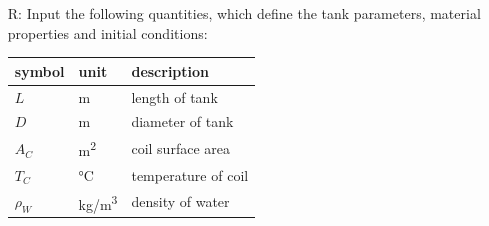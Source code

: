\documentclass[12pt]{article}
\newcounter{reqnum} %
\begin{document}
\noindent \begin{itemize}

\item[R\refstepcounter{reqnum}\thereqnum \label{R_RawInputs}:] Input the following
  quantities, which define the tank parameters, material properties and initial
  conditions:

  \renewcommand{\arraystretch}{1.2}
  \noindent \begin{longtable*}{l l p{12cm}} \toprule
              \textbf{symbol} & \textbf{unit} & \textbf{description}\\
              \midrule 
              $L$ & \si{\metre} & length of tank\\
              $D$ & \si{\metre} & diameter of tank\\
              $A_C$ & \si[per-mode=symbol] {\square\metre} & coil surface area\\
              $T_C$ &\si[per-mode=symbol] {\celsius} & temperature of coil\\
              $\rho_W$ & \si[per-mode=symbol] {\kilogram\per\cubic\metre} &
                                                          density of water\\

\end{longtable*}
\end{itemize}
\end{document}
